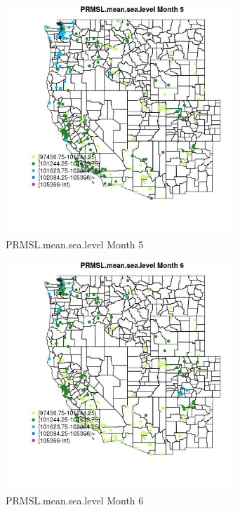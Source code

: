 \begin{figure} 
\centering  
\includegraphics[width=0.77\textwidth]{Code_Outputs/Report_ML_input_PM25_Step4_part_e_de_duplicated_aveswNAs_MapObsMo5PRMSLmeansealevel.jpg} 
\caption{\label{fig:Report_ML_input_PM25_Step4_part_e_de_duplicated_aveswNAsMapObsMo5PRMSLmeansealevel}PRMSL.mean.sea.level Month 5} 
\end{figure} 
 

\clearpage 

\begin{figure} 
\centering  
\includegraphics[width=0.77\textwidth]{Code_Outputs/Report_ML_input_PM25_Step4_part_e_de_duplicated_aveswNAs_MapObsMo6PRMSLmeansealevel.jpg} 
\caption{\label{fig:Report_ML_input_PM25_Step4_part_e_de_duplicated_aveswNAsMapObsMo6PRMSLmeansealevel}PRMSL.mean.sea.level Month 6} 
\end{figure} 
 

